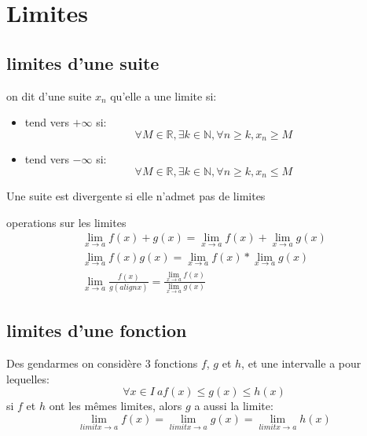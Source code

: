 \section{Limites}
	\subsection{limites d'une suite}
	\begin{definition}
		on dit d'une suite $x_n$ qu'elle a une limite si:
		\begin{itemize}
			\item tend vers $+\infty$ si:
			\begin{equation*}
				\forall M \in \mathbb{R}, \exists k \in \mathbb{N}, \forall n \geq k, x_n\geq M 
			\end{equation*}

			\item tend vers $-\infty$ si:
			\begin{equation*}
				\forall M \in \mathbb{R}, \exists k \in \mathbb{N}, \forall n \geq k, x_n\leq M 
			\end{equation*}
		\end{itemize}
	\end{definition}
	Une suite est divergente si elle n'admet pas de limites
	\begin{definition}
		operations sur les limites
		\begin{gather*}
			\lim_{x \to a} f(x)+g(x)=\lim_{x \to a} f(x)+\lim_{x \to a} g(x) \\
			\lim_{x \to a} f(x)g(x)=\lim_{x \to a} f(x)*\lim_{x \to a} g(x) \\
			\lim_{x \to a} \frac{f(x)}{g(alignx)}=\frac{\lim_{x \to a} f(x)}{\lim_{x \to a} g(x)}
		\end{gather*}
	\end{definition}
	\subsection{limites d'une fonction}
	
	\begin{theorem}{Des gendarmes}
		on consid\`ere 3 fonctions $f$, $g$ et $h$, et une intervalle a pour lequelles:
		\begin{equation*}
			\forall x \in I \ {a} f(x)\leq g(x) \leq h(x)	
   		\end{equation*}
		si $f$ et $h$ ont les m\^emes limites, alors $g$ a aussi la limite:
		\begin{equation*}
			\lim_{limit{x \to a}}f(x) = \lim_{limit{x \to a}}g(x) = \lim_{limit{x \to a}}h(x)  
		\end{equation*}
	\end{theorem}
	
